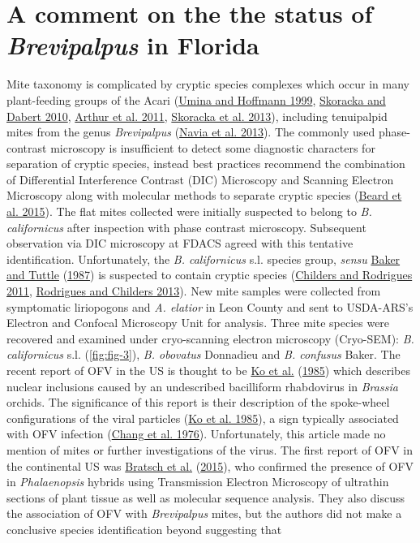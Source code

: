 \documentclass[12pt,final,CPage]{ufthesis}
\begin{document}
{{  \section{\texorpdfstring{A comment on the the status of \emph{Brevipalpus} in Florida}{A comment on the the status of Brevipalpus in Florida}}\label{a-comment-on-the-the-status-of-brevipalpus-in-florida}}

  Mite taxonomy is complicated by cryptic species complexes which occur in many plant-feeding groups of the Acari (\protect\hyperlink{ref-Umina1999}{Umina and Hoffmann 1999}, \protect\hyperlink{ref-Skoracka2010}{Skoracka and Dabert 2010}, \protect\hyperlink{ref-Arthur2011}{Arthur et al. 2011}, \protect\hyperlink{ref-Skoracka2013}{Skoracka et al. 2013}), including tenuipalpid mites from the genus \emph{Brevipalpus} (\protect\hyperlink{ref-Navia2013}{Navia et al. 2013}). The commonly used phase-contrast microscopy is insufficient to detect some diagnostic characters for separation of cryptic species, instead best practices recommend the combination of Differential Interference Contrast (DIC) Microscopy and Scanning Electron Microscopy along with molecular methods to separate cryptic species (\protect\hyperlink{ref-Beard2015}{Beard et al. 2015}). The flat mites collected were initially suspected to belong to \emph{B. californicus} after inspection with phase contrast microscopy. Subsequent observation via DIC microscopy at FDACS agreed with this tentative identification. Unfortunately, the \emph{B. californicus} s.l. species group, \emph{sensu} \protect\hyperlink{ref-Baker1987}{Baker and Tuttle} (\protect\hyperlink{ref-Baker1987}{1987}) is suspected to contain cryptic species (\protect\hyperlink{ref-Childers2011}{Childers and Rodrigues 2011}, \protect\hyperlink{ref-Rodrigues2013}{Rodrigues and Childers 2013}). New mite samples were collected from symptomatic liriopogons and \emph{A. elatior} in Leon County and sent to USDA-ARS's Electron and Confocal Microscopy Unit for analysis. Three mite species were recovered and examined under cryo-scanning electron microscopy (Cryo-SEM): \emph{B. californicus} s.l. (\ref{fig:fig-3}), \emph{B. obovatus} Donnadieu and \emph{B. confusus} Baker. The recent report of OFV in the US is thought to be \protect\hyperlink{ref-Ko1985}{Ko et al.} (\protect\hyperlink{ref-Ko1985}{1985}) which describes nuclear inclusions caused by an undescribed bacilliform rhabdovirus in \emph{Brassia} orchids. The significance of this report is their description of the spoke-wheel configurations of the viral particles (\protect\hyperlink{ref-Ko1985}{Ko et al. 1985}), a sign typically associated with OFV infection (\protect\hyperlink{ref-Chang1976}{Chang et al. 1976}). Unfortunately, this article made no mention of mites or further investigations of the virus. The first report of OFV in the continental US was \protect\hyperlink{ref-Bratsch2015}{Bratsch et al.} (\protect\hyperlink{ref-Bratsch2015}{2015}), who confirmed the presence of OFV in \emph{Phalaenopsis} hybrids using Transmission Electron Microscopy of ultrathin sections of plant tissue as well as molecular sequence analysis. They also discuss the association of OFV with \emph{Brevipalpus} mites, but the authors did not make a conclusive species identification beyond suggesting that }
\end{document}
